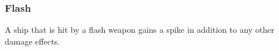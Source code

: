 \subsubsection{Flash}
A ship that is hit by a flash weapon gains a spike in addition to any other damage effects.